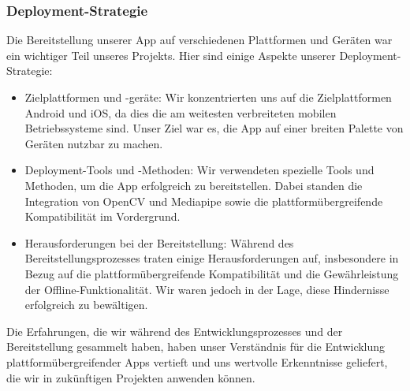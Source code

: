 	\subsubsection{Deployment-Strategie}
	\label{sssec:deployment}
		
		Die Bereitstellung unserer App auf verschiedenen Plattformen und Geräten war ein wichtiger Teil unseres Projekts. Hier sind einige Aspekte unserer Deployment-Strategie:
		
		\begin{itemize}
			\item Zielplattformen und -geräte: Wir konzentrierten uns auf die Zielplattformen Android und iOS, da dies die am weitesten verbreiteten mobilen Betriebssysteme sind. Unser Ziel war es, die App auf einer breiten Palette von Geräten nutzbar zu machen.
			
			\item Deployment-Tools und -Methoden: Wir verwendeten spezielle Tools und Methoden, um die App erfolgreich zu bereitstellen. Dabei standen die Integration von OpenCV und Mediapipe sowie die plattformübergreifende Kompatibilität im Vordergrund.
			
			\item Herausforderungen bei der Bereitstellung: Während des Bereitstellungsprozesses traten einige Herausforderungen auf, insbesondere in Bezug auf die plattformübergreifende Kompatibilität und die Gewährleistung der Offline-Funktionalität. Wir waren jedoch in der Lage, diese Hindernisse erfolgreich zu bewältigen.
		\end{itemize}
		
		\noindent Die Erfahrungen, die wir während des Entwicklungsprozesses und der Bereitstellung gesammelt haben, haben unser Verständnis für die Entwicklung plattformübergreifender Apps vertieft und uns wertvolle Erkenntnisse geliefert, die wir in zukünftigen Projekten anwenden können.